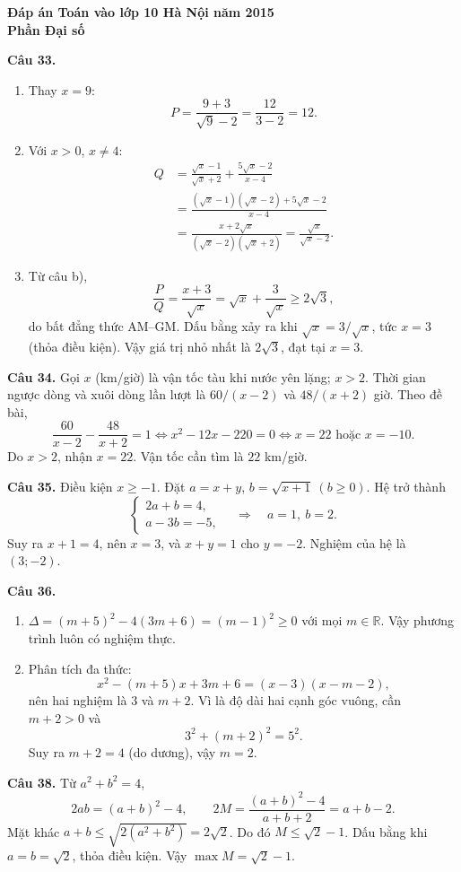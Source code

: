 \documentclass[12pt,a4paper]{article}
\begin{document}
\begin{center}{\Large\bfseries Đáp án Toán vào lớp 10 Hà Nội năm 2015\\Phần Đại số}\end{center}
\textbf{Câu 33.}
\begin{enumerate}[label=\alph*)]
\item Thay $x=9$:
\[
P=\frac{9+3}{\sqrt9-2}=\frac{12}{3-2}=12.
\]
\item Với $x>0$, $x\ne4$:
\begin{align*}
Q&=\frac{\sqrt{x}-1}{\sqrt{x}+2}+\frac{5\sqrt{x}-2}{x-4}\\
&=\frac{(\sqrt{x}-1)(\sqrt{x}-2)+5\sqrt{x}-2}{x-4}\\
&=\frac{x+2\sqrt{x}}{(\sqrt{x}-2)(\sqrt{x}+2)}
=\frac{\sqrt{x}}{\sqrt{x}-2}.
\end{align*}
\item Từ câu b),
\[
\frac{P}{Q}=\frac{x+3}{\sqrt{x}}=\sqrt{x}+\frac{3}{\sqrt{x}}\ge2\sqrt3,
\]
do bất đẳng thức AM--GM. Dấu bằng xảy ra khi $\sqrt{x}=3/\sqrt{x}$, tức $x=3$ (thỏa điều kiện). Vậy giá trị nhỏ nhất là $2\sqrt3$, đạt tại $x=3$.
\end{enumerate}

\textbf{Câu 34.} Gọi $x$ (km/giờ) là vận tốc tàu khi nước yên lặng; $x>2$. Thời gian ngược dòng và xuôi dòng lần lượt là $60/(x-2)$ và $48/(x+2)$ giờ. Theo đề bài,
\[
\frac{60}{x-2}-\frac{48}{x+2}=1
\iff x^2-12x-220=0
\iff x=22\text{ hoặc }x=-10.
\]
Do $x>2$, nhận $x=22$. Vận tốc cần tìm là $22$ km/giờ.

\textbf{Câu 35.} Điều kiện $x\ge-1$. Đặt $a=x+y$, $b=\sqrt{x+1}\ (b\ge0)$. Hệ trở thành
\[
\begin{cases}2a+b=4,\\a-3b=-5,\end{cases}
\quad\Rightarrow\quad a=1,\ b=2.
\]
Suy ra $x+1=4$, nên $x=3$, và $x+y=1$ cho $y=-2$. Nghiệm của hệ là $(3;-2)$.

\textbf{Câu 36.}
\begin{enumerate}[label=\alph*)]
\item $\Delta=(m+5)^2-4(3m+6)=(m-1)^2\ge0$ với mọi $m\in\mathbb R$. Vậy phương trình luôn có nghiệm thực.
\item Phân tích đa thức:
\[
x^2-(m+5)x+3m+6=(x-3)(x-m-2),
\]
nên hai nghiệm là $3$ và $m+2$. Vì là độ dài hai cạnh góc vuông, cần $m+2>0$ và
\[
3^2+(m+2)^2=5^2.
\]
Suy ra $m+2=4$ (do dương), vậy $m=2$.
\end{enumerate}

\textbf{Câu 38.} Từ $a^2+b^2=4$,
\[
2ab=(a+b)^2-4,\qquad 2M=\frac{(a+b)^2-4}{a+b+2}=a+b-2.
\]
Mặt khác $a+b\le\sqrt{2(a^2+b^2)}=2\sqrt2$. Do đó $M\le\sqrt2-1$. Dấu bằng khi $a=b=\sqrt2$, thỏa điều kiện. Vậy $\max M=\sqrt2-1$.
\end{document}
